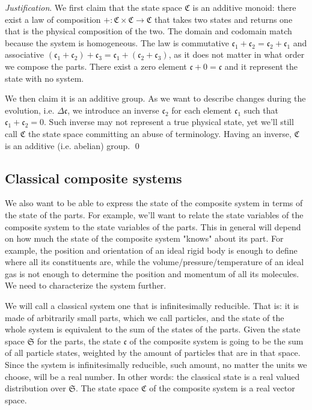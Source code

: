 \documentclass[aps,pra,10pt,twocolumn,floatfix,nofootinbib]{revtex4-1}
\theoremstyle{definition}
\newenvironment{justification}{\emph{Justification}.}{\qed}
\begin{document}
\begin{justification}
We first claim that the state space $\mathfrak{C}$ is an additive monoid: there exist a law of composition $+ : \mathfrak{C} \times \mathfrak{C} \rightarrow \mathfrak{C}$ that takes two states and returns one that is the physical composition of the two. The domain and codomain match because the system is homogeneous. The law is commutative $\mathfrak{c}_1 +\mathfrak{c}_2 = \mathfrak{c}_2+\mathfrak{c}_1$ and associative $(\mathfrak{c}_1 + \mathfrak{c}_2) + \mathfrak{c}_3 = \mathfrak{c}_1 + (\mathfrak{c}_2 + \mathfrak{c}_3)$, as it does not matter in what order we compose the parts. There exist a zero element $\mathfrak{c} + 0 = \mathfrak{c}$ and it represent the state with no system.

We then claim it is an additive group. As we want to describe changes during the evolution, i.e. $\Delta \mathfrak{c}$, we introduce an inverse $\mathfrak{c}_2$ for each element $\mathfrak{c}_1$ such that $\mathfrak{c}_1 + \mathfrak{c}_2 = 0$. Such inverse may not represent a true physical state, yet we'll still call $\mathfrak{C}$ the state space committing an abuse of terminology. Having an inverse, $\mathfrak{C}$ is an additive (i.e. abelian) group.
\end{justification}

\subsection{Classical composite systems}
We also want to be able to express the state of the composite system in terms of the state of the parts. For example, we'll want to relate the state variables of the composite system to the state variables of the parts. This in general will depend on how much the state of the composite system "knows" about its part. For example, the position and orientation of an ideal rigid body is enough to define where all its constituents are, while the volume/pressure/temperature of an ideal gas is not enough to determine the position and momentum of all its molecules. We need to characterize the system further.

We will call a classical system one that is infinitesimally reducible. That is: it is made of arbitrarily small parts, which we call particles, and the state of the whole system is equivalent to the sum of the states of the parts. Given the state space $\mathfrak{S}$ for the parts, the state $\mathfrak{c}$ of the composite system is going to be the sum of all particle states, weighted by the amount of particles that are in that space. Since the system is infinitesimally reducible, such amount, no matter the units we choose, will be a real number. In other words: the classical state is a real valued distribution over $\mathfrak{S}$. The state space $\mathfrak{C}$ of the composite system is a real vector space.
\end{document}
